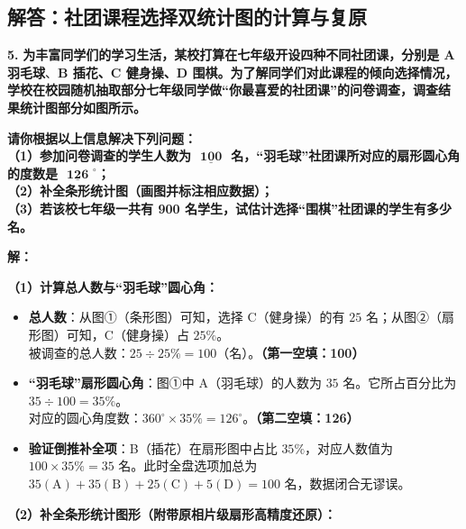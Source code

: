 \newpage

\newpage

\subsection{解答：社团课程选择双统计图的计算与复原}

\vspace{0.6cm}

\textbf{\LARGE 5.} \textbf{为丰富同学们的学习生活，某校打算在七年级开设四种不同社团课，分别是 A 羽毛球$、$B 插花、C 健身操、D 围棋。为了解同学们对此课程的倾向选择情况，学校在校园随机抽取部分七年级同学做“你最喜爱的社团课”的问卷调查，调查结果统计图部分如图所示。}

\textbf{请你根据以上信息解决下列问题：\\
（1）参加问卷调查的学生人数为 $\underline{\textbf{    100    }}$ 名，“羽毛球”社团课所对应的扇形圆心角的度数是 $\underline{\textbf{  126  }}^\circ$；\\
（2）补全条形统计图（画图并标注相应数据）；\\
（3）若该校七年级一共有 900 名学生，试估计选择“围棋”社团课的学生有多少名。}

\vspace{0.4cm}
\textbf{解：}

\textbf{（1）计算总人数与“羽毛球”圆心角：}
\begin{itemize}
    \item \textbf{总人数}：从图①（条形图）可知，选择 C（健身操）的有 $25$ 名；从图②（扇形图）可知，C（健身操）占 $25\%$。\\
    被调查的总人数：$25 \div 25\% = 100$（名）。\textbf{（第一空填：100）}
    \item \textbf{“羽毛球”扇形圆心角}：图①中 A（羽毛球）的人数为 $35$ 名。它所占百分比为 $35 \div 100 = 35\%$。\\
    对应的圆心角度数：$360^\circ \times 35\% = 126^\circ$。\textbf{（第二空填：126）}
    \item \textbf{验证倒推补全项}：B（插花）在扇形图中占比 $35\%$，对应人数值为 $100 \times 35\% = 35$ 名。此时全盘选项加总为 $35(\text{A}) + 35(\text{B}) + 25(\text{C}) + 5(\text{D}) = 100$ 名，数据闭合无谬误。
\end{itemize}

\textbf{（2）补全条形统计图形（附带原相片级扇形高精度还原）：}

